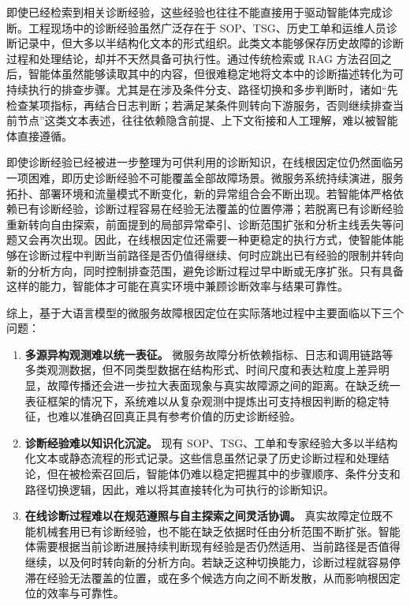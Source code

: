 即使已经检索到相关诊断经验，这些经验也往往不能直接用于驱动智能体完成诊断。工程现场中的诊断经验虽然广泛存在于 SOP、TSG、历史工单和运维人员诊断记录中，但大多以半结构化文本的形式组织。此类文本能够保存历史故障的诊断过程和处理结论，却并不天然具备可执行性。通过传统检索或 RAG 方法召回之后，智能体虽然能够读取其中的内容，但很难稳定地将文本中的诊断描述转化为可持续执行的排查步骤。尤其是在涉及条件分支、路径切换和多步判断时，诸如“先检查某项指标，再结合日志判断；若满足某条件则转向下游服务，否则继续排查当前节点”这类文本表述，往往依赖隐含前提、上下文衔接和人工理解，难以被智能体直接遵循。

即使诊断经验已经被进一步整理为可供利用的诊断知识，在线根因定位仍然面临另一项困难，即历史诊断经验不可能覆盖全部故障场景。微服务系统持续演进，服务拓扑、部署环境和流量模式不断变化，新的异常组合会不断出现。若智能体严格依赖已有诊断经验，诊断过程容易在经验无法覆盖的位置停滞；若脱离已有诊断经验重新转向自由探索，前面提到的局部异常牵引、诊断范围扩张和分析主线丢失等问题又会再次出现。因此，在线根因定位还需要一种更稳定的执行方式，使智能体能够在诊断过程中判断当前路径是否仍值得继续、何时应跳出已有经验的限制并转向新的分析方向，同时控制排查范围，避免诊断过程过早中断或无序扩张。只有具备这样的能力，智能体才可能在真实环境中兼顾诊断效率与结果可靠性。


综上，基于大语言模型的微服务故障根因定位在实际落地过程中主要面临以下三个问题：

\begin{enumerate}[label=（\arabic*）]
    \item \textbf{多源异构观测难以统一表征。} 微服务故障分析依赖指标、日志和调用链路等多类观测数据，但不同类型数据在结构形式、时间尺度和表达粒度上差异明显，故障传播还会进一步拉大表面现象与真实故障源之间的距离。在缺乏统一表征框架的情况下，系统难以从复杂观测中提炼出可支持根因判断的稳定特征，也难以准确召回真正具有参考价值的历史诊断经验。

    \item \textbf{诊断经验难以知识化沉淀。} 现有 SOP、TSG、工单和专家经验大多以半结构化文本或静态流程的形式记录。这些信息虽然记录了历史诊断过程和处理结论，但在被检索召回后，智能体仍难以稳定把握其中的步骤顺序、条件分支和路径切换逻辑，因此，难以将其直接转化为可执行的诊断知识。

    \item \textbf{在线诊断过程难以在规范遵照与自主探索之间灵活协调。} 真实故障定位既不能机械套用已有诊断经验，也不能在缺乏依据时任由分析范围不断扩张。智能体需要根据当前诊断进展持续判断现有经验是否仍然适用、当前路径是否值得继续，以及何时转向新的分析方向。若缺乏这种切换能力，诊断过程就容易停滞在经验无法覆盖的位置，或在多个候选方向之间不断发散，从而影响根因定位的效率与可靠性。
    
\end{enumerate}

